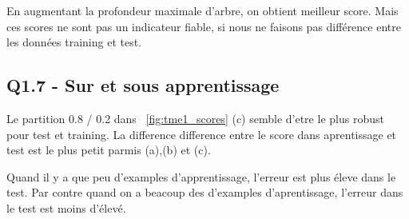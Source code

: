 \documentclass[a4paper,12pt]{article}
\begin{document}
En augmentant la profondeur maximale d'arbre, on obtient meilleur score.
Mais ces scores ne sont pas un indicateur fiable, si nous ne faisons pas différence entre les données training et test.

\subsection{Q1.7 -  Sur et sous apprentissage }

Le partition 0.8 / 0.2 dans ~\autoref{fig:tme1_scores} (c) semble d'etre le plus robust pour test et training.
La difference difference entre le score dans aprentissage et test est le plus petit parmis (a),(b) et (c).

Quand il y a que peu d'examples d'apprentissage, l'erreur est plus éleve dans le test.
Par contre quand on a beacoup des d'examples d'aprentissage, l'erreur dans le test est moins d'élevé.
\end{document}
